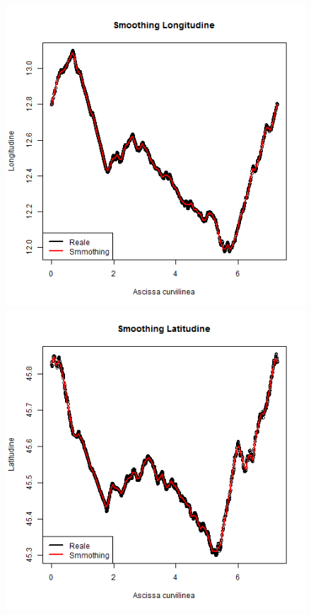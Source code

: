 \documentclass[a4paper,11pt,twoside,openright]{book}							%
\begin{document}
\begin{figure}[!t]
\centering
\begin{minipage}{.32\textwidth}
\includegraphics[width=\textwidth]{Immagini/Longitudine.png}
\includegraphics[width=\textwidth]{Immagini/Latitudine.png}

\end{minipage}
\end{figure}
\end{document}
